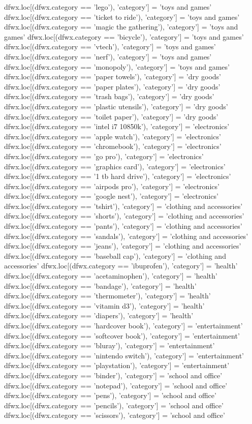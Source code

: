 \begin{python}
dfwx.loc[(dfwx.category == 'lego'), 'category'] = 'toys and games'
dfwx.loc[(dfwx.category == 'ticket to ride'), 'category'] = 'toys and games'
dfwx.loc[(dfwx.category == 'magic the gathering'), 'category'] = 'toys and games'
dfwx.loc[(dfwx.category == 'bicycle'), 'category'] = 'toys and games'
dfwx.loc[(dfwx.category == 'vtech'), 'category'] = 'toys and games'
dfwx.loc[(dfwx.category == 'nerf'), 'category'] = 'toys and games'
dfwx.loc[(dfwx.category == 'monopoly'), 'category'] = 'toys and games'
dfwx.loc[(dfwx.category == 'paper towels'), 'category'] = 'dry goods'
dfwx.loc[(dfwx.category == 'paper plates'), 'category'] = 'dry goods'
dfwx.loc[(dfwx.category == 'trash bags'), 'category'] = 'dry goods'
dfwx.loc[(dfwx.category == 'plastic utensils'), 'category'] = 'dry goods'
dfwx.loc[(dfwx.category == 'toilet paper'), 'category'] = 'dry goods'
dfwx.loc[(dfwx.category == 'intel i7 10850k'), 'category'] = 'electronics'
dfwx.loc[(dfwx.category == 'apple watch'), 'category'] = 'electronics'
dfwx.loc[(dfwx.category == 'chromebook'), 'category'] = 'electronics'
dfwx.loc[(dfwx.category == 'go pro'), 'category'] = 'electronics'
dfwx.loc[(dfwx.category == 'graphics card'), 'category'] = 'electronics'
dfwx.loc[(dfwx.category == '1 tb hard drive'), 'category'] = 'electronics'
dfwx.loc[(dfwx.category == 'airpods pro'), 'category'] = 'electronics'
dfwx.loc[(dfwx.category == 'google nest'), 'category'] = 'electronics'
dfwx.loc[(dfwx.category == 'tshirt'), 'category'] = 'clothing and accessories'
dfwx.loc[(dfwx.category == 'shorts'), 'category'] = 'clothing and accessories'
dfwx.loc[(dfwx.category == 'pants'), 'category'] = 'clothing and accessories'
dfwx.loc[(dfwx.category == 'sandals'), 'category'] = 'clothing and accessories'
dfwx.loc[(dfwx.category == 'jeans'), 'category'] = 'clothing and accessories'
dfwx.loc[(dfwx.category == 'baseball cap'), 'category'] = 'clothing and accessories'
dfwx.loc[(dfwx.category == 'ibuprofen'), 'category'] = 'health'
dfwx.loc[(dfwx.category == 'acetaminophen'), 'category'] = 'health'
dfwx.loc[(dfwx.category == 'bandage'), 'category'] = 'health'
dfwx.loc[(dfwx.category == 'thermometer'), 'category'] = 'health'
dfwx.loc[(dfwx.category == 'vitamin d3'), 'category'] = 'health'
dfwx.loc[(dfwx.category == 'diapers'), 'category'] = 'health'
dfwx.loc[(dfwx.category == 'hardcover book'), 'category'] = 'entertainment'
dfwx.loc[(dfwx.category == 'softcover book'), 'category'] = 'entertainment'
dfwx.loc[(dfwx.category == 'bluray'), 'category'] = 'entertainment'
dfwx.loc[(dfwx.category == 'nintendo switch'), 'category'] = 'entertainment'
dfwx.loc[(dfwx.category == 'playstation'), 'category'] = 'entertainment'
dfwx.loc[(dfwx.category == 'binder'), 'category'] = 'school and office'
dfwx.loc[(dfwx.category == 'notepad'), 'category'] = 'school and office'
dfwx.loc[(dfwx.category == 'pens'), 'category'] = 'school and office'
dfwx.loc[(dfwx.category == 'pencils'), 'category'] = 'school and office'
dfwx.loc[(dfwx.category == 'scissors'), 'category'] = 'school and office'


\end{python}
